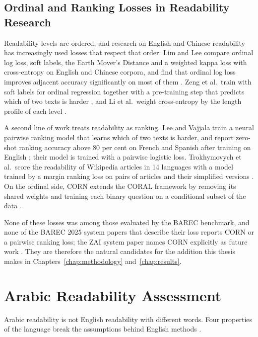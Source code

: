 \subsection{Ordinal and Ranking Losses in Readability Research}
\label{sec:lit-readability-losses}

Readability levels are ordered, and research on English and Chinese readability has increasingly
used losses that respect that order. Lim and Lee compare ordinal log loss, soft labels, the
Earth Mover's Distance and a weighted kappa loss with cross-entropy on English and Chinese
corpora, and find that ordinal log loss improves adjacent accuracy significantly on most of
them \cite{lim-lee-2024-improving}. Zeng et al.\ train with soft labels for ordinal regression
together with a pre-training step that predicts which of two texts is harder
\cite{zeng-etal-2022-enhancing}, and Li et al.\ weight cross-entropy by the length profile of
each level \cite{li-etal-2022-unified}.

A second line of work treats readability as ranking. Lee and Vajjala train a neural pairwise
ranking model that learns which of two texts is harder, and report zero-shot ranking accuracy
above 80 per cent on French and Spanish after training on English \cite{lee2022neural}; their
model is trained with a pairwise logistic loss. Trokhymovych et al.\ score the readability of
Wikipedia articles in 14 languages with a model trained by a margin ranking loss on pairs of
articles and their simplified versions \cite{trokhymovych2024readability}. On the ordinal side,
CORN extends the CORAL framework by removing its shared weights and training each binary
question on a conditional subset of the data \cite{shi2023corn}.

None of these losses was among those evaluated by the BAREC benchmark, and none of the BAREC
2025 system papers that describe their loss reports CORN or a pairwise ranking loss; the ZAI
system paper names CORN explicitly as future work \cite{nazzal2025zai}. They are therefore the natural candidates for
the addition this thesis makes in Chapters~\ref{chap:methodology} and~\ref{chap:results}.

\section{Arabic Readability Assessment}
\label{sec:lit-arabic}

Arabic readability is not English readability with different words. Four properties of the
language break the assumptions behind English methods \cite{habash2010introduction,
nassiri2023approaches}.


